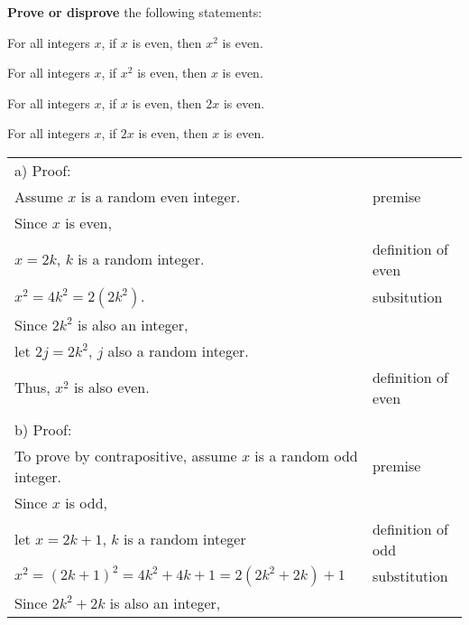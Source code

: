 \documentclass[12pt]{exam}
\begin{document}
\textbf{Prove or disprove} the following statements:

\begin{qparts}
	\item For all integers $x$, if $x$ is even, then $x^2$ is even.
	\item For all integers $x$, if $x^2$ is even, then $x$ is even.
	\item For all integers $x$, if $x$ is even, then $2x$ is even.
	\item For all integers $x$, if $2x$ is even, then $x$ is even.
\end{qparts}

\begin{solution}
	\begin{tabular}{ll}
		a) Proof:                                                                                 \\
		Assume $x$ is a random even integer.                            & premise                 \\
		Since $x$ is even,                                                                        \\
		$x=2k$, $k$ is a random integer.                                & definition of even      \\
		$x^2= 4k^2 = 2(2k^2)$.                                          & subsitution             \\
		Since $2k^2$ is also an integer,                                                          \\
		let $2j=2k^2$, $j$ also a random integer.                                                 \\
		Thus, $x^2$ is also even.                                       & definition of even      \\
		\\
		b) Proof:                                                                                 \\
		To prove by contrapositive, assume $x$ is a random odd integer. & premise                 \\
		Since $x$ is odd,                                                                         \\
		let $x=2k+1$, $k$ is a random integer                           & definition of odd       \\
		$x^2=(2k+1)^2=4k^2+4k+1=2(2k^2+2k)+1$                           & substitution            \\
		Since $2k^2+2k$ is also an integer,                                                       \\

\end{tabular}
\end{solution}
\end{document}
